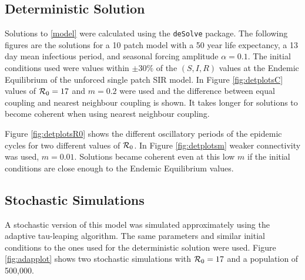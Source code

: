 \documentclass[twocolumn,nofootinbib,showkeys,twoside,floatfix,unsortedaddress,flushbottom,10pt,aps,pra]{report}
\begin{document}
\subsection{Deterministic Solution}
Solutions to \eqref{model} were calculated using the \Rlogo \texttt{deSolve} package. 
The following figures are the solutions for a 10 patch model with a 50 year life expectancy, a 13 day mean infectious period, and seasonal forcing amplitude $\alpha = 0.1$. The initial conditions used were values within $\pm30\%$ of the $(S,I,R)$ values at the Endemic Equilibrium of the unforced single patch SIR model. In Figure \ref{fig:detplotsC} values of ${\cal R}_0=17$ and $m=0.2$ were used and the difference between equal coupling and nearest neighbour coupling is shown. It takes longer for solutions to become coherent when using nearest neighbour coupling. \par
 \smallskip \qquad

Figure \ref{fig:detplotsR0} shows the different oscillatory periods of the epidemic cycles for two different values of ${\cal R}_0$. 
In Figure \ref{fig:detplotsm} weaker connectivity was used, $m=0.01$.  Solutions became coherent even at this low $m$ if the initial conditions are close enough to the Endemic Equilibrium values. 

\subsection{Stochastic Simulations} 
\indent
A stochastic version of this model was simulated approximately using the adaptive tau-leaping algorithm. The same parameters and similar initial conditions to the ones used for the deterministic solution were used. Figure \ref{fig:adapplot} shows two stochastic simulations with ${\cal R}_0=17$ and a population of 500,000.

\begin{figure*}
    \caption{An approximate stochastic simulation using the adaptive tau-leaping method.}
    \label{fig:adapplot}
    \centering
    }
    \subfigure[$m=0.01$]
    {
        \texttt{[image: \{images/adaptauECR017m0.01]}.pdf}
    }   
\end{figure*}
\end{document}
